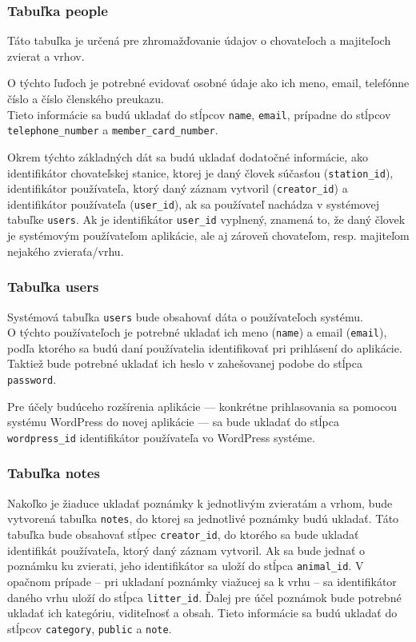 \subsubsection*{Tabuľka people}
Táto tabuľka je určená pre zhromažďovanie údajov o chovateľoch a majiteľoch zvierat a vrhov.

O týchto ľuďoch je potrebné evidovať osobné údaje ako ich meno, email, telefónne číslo a číslo členského preukazu.
\\ Tieto informácie sa budú ukladať do stĺpcov \texttt{name}, \texttt{email}, prípadne do stĺpcov \texttt{telephone_number} a \texttt{member_card_number}.

Okrem týchto základných dát sa budú ukladať dodatočné informácie, ako identifikátor chovateľskej stanice, ktorej je daný človek súčasťou (\texttt{station_id}), identifikátor používateľa, ktorý daný záznam vytvoril (\texttt{creator_id}) a identifikátor používateľa (\texttt{user_id}), ak sa používateľ nachádza v systémovej tabuľke \texttt{users}. Ak je identifikátor \texttt{user_id} vyplnený, znamená to, že daný človek je systémovým používateľom aplikácie, ale aj zároveň chovateľom, resp. majiteľom nejakého zvieraťa/vrhu.

\subsubsection*{Tabuľka users}
Systémová tabuľka \texttt{users} bude obsahovať dáta o používateľoch systému.\\ O týchto používateľoch je potrebné ukladať ich meno (\texttt{name}) a email (\texttt{email}), podľa ktorého sa budú daní používatelia identifikovať pri prihlásení do aplikácie. Taktiež bude potrebné ukladať ich heslo v zahešovanej podobe do stĺpca \texttt{password}.

Pre účely budúceho rozšírenia aplikácie --- konkrétne prihlasovania sa pomocou systému WordPress do novej aplikácie --- sa bude ukladať do stĺpca \texttt{wordpress_id} identifikátor používateľa vo WordPress systéme.

\subsubsection*{Tabuľka notes}
Nakoľko je žiaduce ukladať poznámky k jednotlivým zvieratám a vrhom, bude vytvorená tabuľka \texttt{notes}, do ktorej sa jednotlivé poznámky budú ukladať.
Táto tabuľka bude obsahovať stĺpec \texttt{creator_id}, do ktorého sa bude ukladať identifikát používateľa, ktorý daný záznam vytvoril. Ak sa bude jednať o poznámku ku zvierati, jeho identifikátor sa uloží do stĺpca \texttt{animal_id}. V opačnom prípade -- pri ukladaní poznámky viažucej sa k vrhu -- sa identifikátor daného vrhu uloží do stĺpca \texttt{litter_id}.
Ďalej pre účel poznámok bude potrebné ukladať ich kategóriu, viditeľnosť a obsah. Tieto informácie sa budú ukladať do stĺpcov \texttt{category}, \texttt{public} a \texttt{note}.

